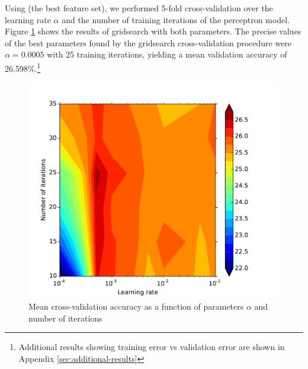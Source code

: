 \documentclass{acm_proc_article-sp}
\begin{document}
Using (the best feature set), we performed 5-fold cross-validation over the learning rate $\alpha$ and the number of training iterations of the perceptron model. Figure \ref{fig:perc-gridsearch} shows the results of gridsearch with both parameters. The precise values of the best parameters found by the gridsearch cross-validation procedure were $\alpha = 0.0005$ with 25 training iterations, yielding a mean validation accuracy of 26.598\%.\footnote{Additional results showing training error vs validation error are shown in Appendix \ref{sec:additional-results}}
\begin{figure}[h!]
	\centering
	\includegraphics[width=\linewidth]{perceptron_gridsearch}
  	\caption{Mean cross-validation accuracy as a function of parameters $\alpha$ and number of iterations}
  	\label{fig:perc-gridsearch}
\end{figure}
\end{document}
